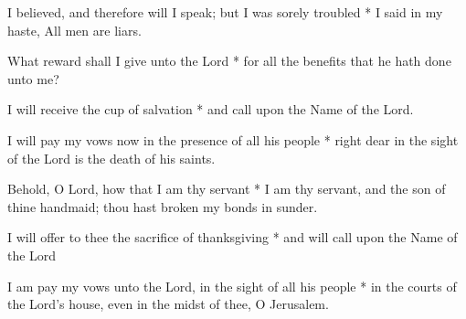 \begin{multicols}{2}
	
	I believed, and therefore will I speak; but I was sorely troubled * I said in my haste, All men are liars.
	
	What reward shall I give unto the Lord * for all the benefits that he hath done unto me?
	
	I will receive the cup of salvation * and call upon the Name of the Lord.
	
	I will pay my vows now in the presence of all his people * right dear in the sight of the Lord is the death of his saints.
	
	Behold, O Lord, how that I am thy servant * I am thy servant, and the son of thine handmaid; thou hast broken my bonds in sunder.
	
	I will offer to thee the sacrifice of thanksgiving * and will call upon the Name of the Lord
	
	I am pay my vows unto the Lord, in the sight of all his people * in the courts of the Lord's house, even in the midst of thee, O Jerusalem.
	
	\gloria{}
\end{multicols}